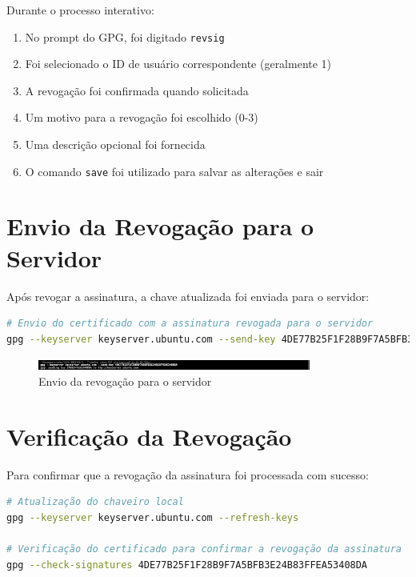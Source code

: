 Durante o processo interativo:
\begin{enumerate}
    \item No prompt do GPG, foi digitado \texttt{revsig}
    \item Foi selecionado o ID de usuário correspondente (geralmente 1)
    \item A revogação foi confirmada quando solicitada
    \item Um motivo para a revogação foi escolhido (0-3)
    \item Uma descrição opcional foi fornecida
    \item O comando \texttt{save} foi utilizado para salvar as alterações e sair
\end{enumerate}

\section{Envio da Revogação para o Servidor}
Após revogar a assinatura, a chave atualizada foi enviada para o servidor:

\begin{lstlisting}[language=bash]
# Envio do certificado com a assinatura revogada para o servidor
gpg --keyserver keyserver.ubuntu.com --send-key 4DE77B25F1F28B9F7A5BFB3E24B83FFEA53408DA
\end{lstlisting}

\begin{figure}[htb]
    \centering
    \includegraphics[width=0.8\textwidth]{images/03-envio_revogacao_servidor.jpg}
    \caption{Envio da revogação para o servidor}
    \label{fig:envio-revogacao-servidor}
\end{figure}

\section{Verificação da Revogação}
Para confirmar que a revogação da assinatura foi processada com sucesso:

\begin{lstlisting}[language=bash]
# Atualização do chaveiro local
gpg --keyserver keyserver.ubuntu.com --refresh-keys

# Verificação do certificado para confirmar a revogação da assinatura
gpg --check-signatures 4DE77B25F1F28B9F7A5BFB3E24B83FFEA53408DA
\end{lstlisting}

